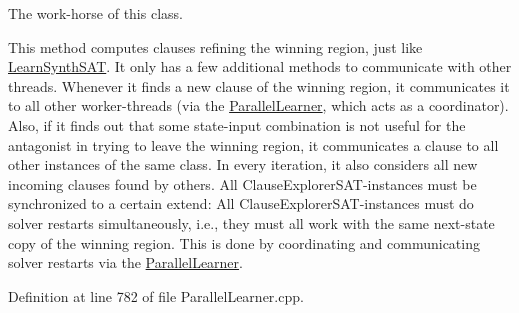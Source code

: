 The work-\/horse of this class. 

This method computes clauses refining the winning region, just like \hyperlink{classLearnSynthSAT}{Learn\-Synth\-S\-A\-T}. It only has a few additional methods to communicate with other threads. Whenever it finds a new clause of the winning region, it communicates it to all other worker-\/threads (via the \hyperlink{classParallelLearner}{Parallel\-Learner}, which acts as a coordinator). Also, if it finds out that some state-\/input combination is not useful for the antagonist in trying to leave the winning region, it communicates a clause to all other instances of the same class. In every iteration, it also considers all new incoming clauses found by others. All Clause\-Explorer\-S\-A\-T-\/instances must be synchronized to a certain extend\-: All Clause\-Explorer\-S\-A\-T-\/instances must do solver restarts simultaneously, i.\-e., they must all work with the same next-\/state copy of the winning region. This is done by coordinating and communicating solver restarts via the \hyperlink{classParallelLearner}{Parallel\-Learner}. 

Definition at line 782 of file Parallel\-Learner.\-cpp.



